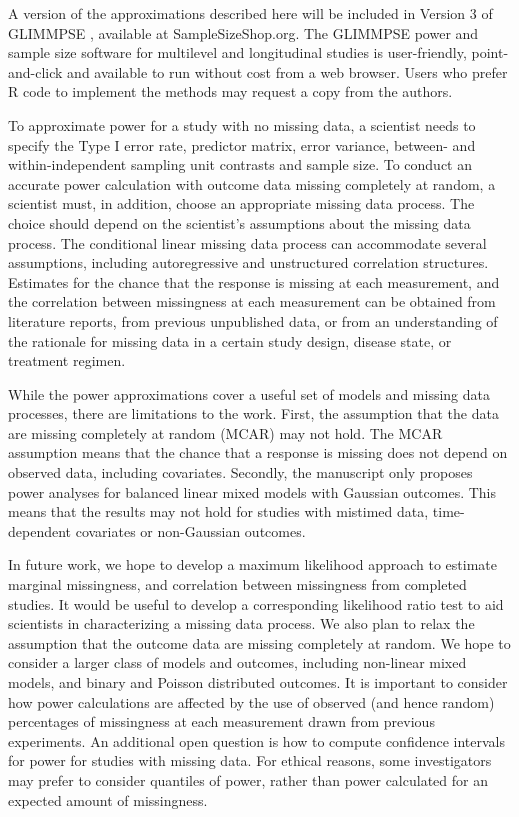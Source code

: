 \documentclass[11pt]{article}
\begin{document}
A version of the approximations described here will be included in Version 3 of GLIMMPSE \cite{kreidler_glimmpse:_2013}, available at SampleSizeShop.org. The GLIMMPSE power and sample size software for multilevel and longitudinal studies is user-friendly, point-and-click and available to run without cost from a web browser. Users who prefer R code to implement the methods may request a copy from the authors.

To approximate power for a study with no missing data, a scientist needs to specify the Type I error rate, predictor matrix, error variance, between- and within-independent sampling unit contrasts and sample size. To conduct an accurate power calculation with outcome data missing completely at random, a scientist must, in addition, choose an appropriate missing data process. The choice should depend on the scientist's assumptions about the missing data process. The conditional linear missing data process can accommodate several assumptions, including autoregressive and unstructured correlation structures. Estimates for the chance that the response is missing at each measurement, and the correlation between missingness at each measurement can be obtained from literature reports, from previous unpublished data, or from an understanding of the rationale for missing data in a certain study design, disease state, or treatment regimen.

While the power approximations cover a useful set of models and missing data processes, there are limitations to the work. First, the assumption that the data are missing completely at random (MCAR) may not hold. The MCAR assumption means that the chance that a response is missing does not depend on observed data, including covariates. Secondly, the manuscript only proposes power analyses for balanced linear mixed models with Gaussian outcomes. This means that the results may not hold for studies with mistimed data, time-dependent covariates or non-Gaussian outcomes.

In future work, we hope to develop a maximum likelihood approach to estimate marginal missingness, and correlation between missingness from completed studies. It would be useful to develop a corresponding likelihood ratio test to aid scientists in characterizing a missing data process. We also plan to relax the assumption that the outcome data are missing completely at random. We hope to consider a larger class of models and outcomes, including non-linear mixed models, and binary and Poisson distributed outcomes. It is important to consider how power calculations are affected by the use of observed (and hence random) percentages of missingness at each measurement drawn from previous experiments. An additional open question is how to compute confidence intervals for power for studies with missing data. For ethical reasons, some investigators may prefer to consider quantiles of power, rather than power calculated for an expected amount of missingness.
\end{document}
